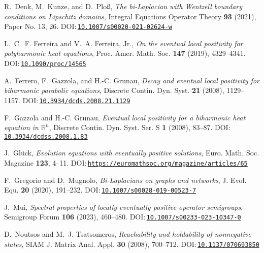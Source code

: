 \documentclass{baustms}
\theoremstyle{cupthm}
\theoremstyle{cupdefn}
\theoremstyle{cuprem}
\numberwithin{equation}{section}
\begin{document}
\begin{thebibliography}{99}
R.~Denk, M.~Kunze, and D.~Plo\ss, \emph{The bi-Laplacian with Wentzell
	boundary conditions on Lipschitz domains}, Integral Equations Operator
Theory \textbf{93} (2021), Paper No. 13, 26.
DOI:\,\href{https://doi.org/10.1007/s00020-021-02624-w}{\nolinkurl{10.1007/s00020-021-02624-w}}

L.~C.~F. Ferreira and V.~A. Ferreira, Jr., \emph{On the eventual local
	positivity for polyharmonic heat equations}, Proc. Amer. Math. Soc.
\textbf{147} (2019), 4329--4341.
DOI:\,\href{https://doi.org/10.1090/proc/14565}{\nolinkurl{10.1090/proc/14565}}

A.~Ferrero, F.~Gazzola, and H.-C. Grunau, \emph{Decay and eventual local
	positivity for biharmonic parabolic equations}, Discrete Contin. Dyn. Syst.
\textbf{21} (2008), 1129--1157.
DOI:\,\href{https://doi.org/10.3934/dcds.2008.21.1129}{\nolinkurl{10.3934/dcds.2008.21.1129}}

F.~Gazzola and H.-C. Grunau, \emph{Eventual local positivity for a biharmonic
	heat equation in {$\mathbb{R}^n$}}, Discrete Contin. Dyn. Syst. Ser. S
\textbf{1} (2008), 83--87.
DOI:\,\href{https://doi.org/10.3934/dcdss.2008.1.83}{\nolinkurl{10.3934/dcdss.2008.1.83}}


J.~Gl\"{u}ck, \emph{Evolution equations with eventually positive solutions}, Euro. Math. Soc. Magazine \textbf{123}, 4--11.
DOI:\,\href{https://euromathsoc.org/magazine/articles/65}{\nolinkurl{https://euromathsoc.org/magazine/articles/65}}

F.~Gregorio and D.~Mugnolo, \emph{Bi-Laplacians on graphs and networks}, J.
Evol. Equ. \textbf{20} (2020), 191--232.
DOI:\,\href{https://doi.org/10.1007/s00028-019-00523-7}{\nolinkurl{10.1007/s00028-019-00523-7}}

J.~Mui, \emph{Spectral properties of locally eventually positive operator semigroups}, Semigroup Forum \textbf{106} (2023), 460--480.
DOI:\,\href{https://doi.org/10.1007/s00233-023-10347-0}{\nolinkurl{10.1007/s00233-023-10347-0}}

D.~Noutsos and M.~J. Tsatsomeros, \emph{Reachability and holdability of
	nonnegative states}, SIAM J. Matrix Anal. Appl. \textbf{30} (2008), 700--712.
DOI:\,\href{https://doi.org/10.1137/070693850}{\nolinkurl{10.1137/070693850}}

\end{thebibliography}

%
%
\end{document}
